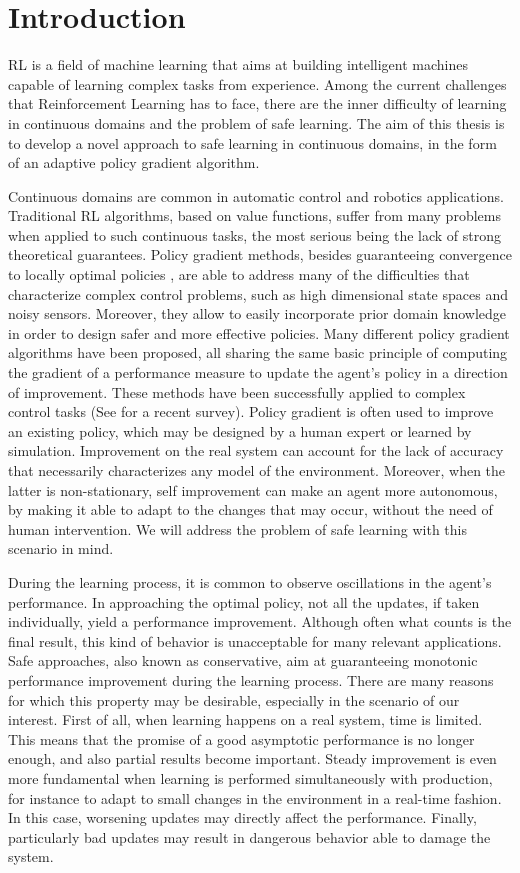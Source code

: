 \chapter{Introduction}\label{chap:intro}
\ac{RL} is a field of machine learning that aims at building intelligent machines capable of learning complex tasks from experience. Among the current challenges that Reinforcement Learning has to face, there are the inner difficulty of learning in continuous domains and the problem of safe learning. The aim of this thesis is to develop a novel approach to safe learning in continuous domains, in the form of an adaptive policy gradient algorithm.

Continuous domains are common in automatic control and robotics applications. Traditional \ac{RL} algorithms, based on value functions, suffer from many problems when applied to such continuous tasks, the most serious being the lack of strong theoretical guarantees.
Policy gradient methods, besides guaranteeing convergence to locally optimal policies \cite{Sutton1999a}, are able to address many of the difficulties that characterize complex control problems, such as high dimensional state spaces and noisy sensors. Moreover, they allow to easily incorporate prior domain knowledge in order to design safer and more effective policies.
Many different policy gradient algorithms have been proposed, all sharing the same basic principle of computing the gradient of a performance measure to update the agent's policy in a direction of improvement. These methods have been successfully applied to complex control tasks (See \cite{deisenroth2013survey} for a recent survey). 
Policy gradient is often used to improve an existing policy, which may be designed by a human expert or learned by simulation. Improvement on the real system can account for the lack of accuracy that necessarily characterizes any model of the environment. Moreover, when the latter is non-stationary, self improvement can make an agent more autonomous, by making it able to adapt to the changes that may occur, without the need of human intervention. We will address the problem of safe learning with this scenario in mind.

During the learning process, it is common to observe oscillations in the agent's performance. In approaching the optimal policy, not all the updates, if taken individually, yield a performance improvement. Although often what counts is the final result, this kind of behavior is unacceptable for many relevant applications. Safe approaches, also known as conservative, aim at guaranteeing monotonic performance improvement during the learning process. There are many reasons for which this property may be desirable, especially in the scenario of our interest. First of all, when learning happens on a real system, time is limited. This means that the promise of a good asymptotic performance is no longer enough, and also partial results become important. Steady improvement is even more fundamental when learning is performed simultaneously with production, for instance to adapt to small changes in the environment in a real-time fashion. In this case, worsening updates may directly affect the performance.
Finally, particularly bad updates may result in dangerous behavior able to damage the system. 

